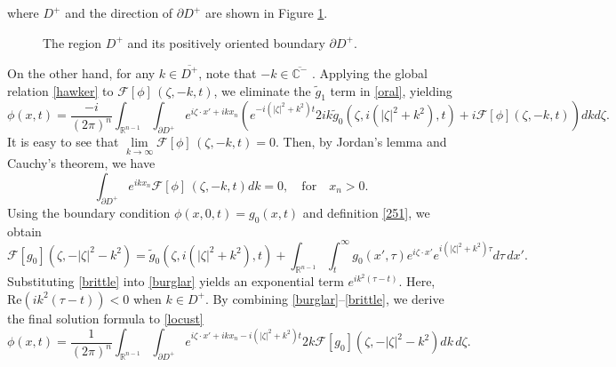 \documentclass[preprint,compress,12pt]{elsarticle}
\numberwithin{equation}{section}
\begin{document}
where $D^{+}$ and the direction of $\partial D^{+}$ are shown in Figure \ref{figure1}.
\begin{figure}
	\begin{center}
	\end{center}
	\caption{The region $D^{+}$ and its positively oriented boundary $\partial D^{+}$.}
	\label{figure1}
\end{figure}

On the other hand, for any $k\in \overline{D^{+}}$, note that $-k\in \overline{\mathbb{C}^{-}}$ . Applying the global relation \eqref{hawker} to $\mathscr{F}[\phi]\,(\zeta, -k,t)$, we eliminate the $\widetilde{g}_{1}$ term in \eqref{oral}, yielding
{\small\begin{equation}\label{burglar}
		\phi(x,t)=\frac{-i}{(2\pi)^{n}}\int_{\mathbb{R}^{n-1}}\int_{\partial D^{+}} e^{i\zeta\cdot x'+ik x_{n}}\left(e^{-i(|\zeta|^{2}+k^{2})t} 2ik \widetilde{g}_{0}(\zeta,i(|\zeta|^{2}+k^{2}),t)+i\mathscr{F}[\phi](\zeta,-k,t)\right) dkd\zeta.
\end{equation}}
It is easy to see that $\lim\limits_{k\rightarrow\infty}\mathscr{F}[\phi]\,\left(\zeta,-k,t\right)=0$. Then, by Jordan's lemma and Cauchy's theorem, we have
\begin{equation}\label{aka}
	\int_{\partial D^{+}}e^{ik x_{n}}\mathscr{F}[\phi]\,\left(\zeta,-k,t\right) dk=0, \quad \text{for}\quad x_{n}>0.
\end{equation}
Using the boundary condition $\phi(x,0,t)=g_{0}(x,t)$ and definition \eqref{251}, we obtain
\begin{equation}\label{brittle} \mathscr{F}[g_{0}]\left(\zeta,-|\zeta|^{2}-k^{2}\right)=\widetilde{g}_{0}\left(\zeta,i(|\zeta|^{2}+k^{2}),t\right)+\int_{\mathbb{R}^{n-1}}\int_{t}^{\infty}    g_{0}(x',\tau) e^{i\zeta\cdot x'} e^{i(|\zeta|^{2}+k^{2})\tau} d\tau\,dx'.
\end{equation}
Substituting  \eqref{brittle} into \eqref{burglar} yields an exponential term $e^{ik^{2}(\tau-t)}$. Here, $\text{Re} \left(ik^{2}(\tau-t)\right)<0$ when $k\in D^{+}$. By combining \eqref{burglar}--\eqref{brittle}, we derive the final solution formula to \eqref{locust}
\begin{equation}\label{mutter}
	\phi(x,t)=\frac{1}{(2\pi)^{n}}\int_{\mathbb{R}^{n-1}}\int_{\partial D^{+}} e^{i\zeta\cdot x'+ik x_{n}-i(|\zeta|^{2}+k^{2})t} 2k \mathscr{F}[g_{0}]\left(\zeta,-|\zeta|^{2}-k^{2}\right) dk\,d\zeta.
\end{equation}
\end{document}
